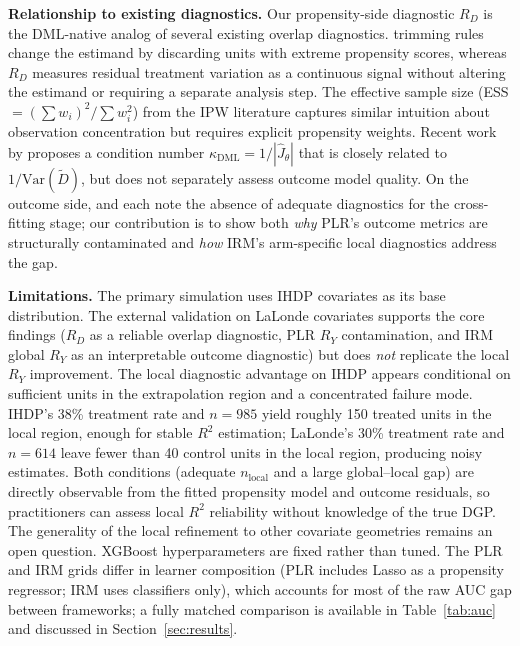\documentclass[12pt]{article}
\begin{document}
\medskip
\noindent\textbf{Relationship to existing diagnostics.} Our propensity-side diagnostic $R_D$ is the DML-native analog of several existing overlap diagnostics. \citet{Crump2009} trimming rules change the estimand by discarding units with extreme propensity scores, whereas $R_D$ measures residual treatment variation as a continuous signal without altering the estimand or requiring a separate analysis step. The effective sample size (ESS $= (\sum w_i)^2 / \sum w_i^2$) from the IPW literature captures similar intuition about observation concentration but requires explicit propensity weights. Recent work by \citet{Chernozhukov2025} proposes a condition number $\kappa_{\text{DML}} = 1/|\hat{J}_\theta|$ that is closely related to $1/\mathrm{Var}(\tilde{D})$, but does not separately assess outcome model quality. On the outcome side, \citet{Knaus2022} and \citet{Babino2020} each note the absence of adequate diagnostics for the cross-fitting stage; our contribution is to show both \emph{why} PLR's outcome metrics are structurally contaminated and \emph{how} IRM's arm-specific local diagnostics address the gap.

\medskip
\noindent\textbf{Limitations.} The primary simulation uses IHDP covariates as its base distribution. The external validation on LaLonde covariates supports the core findings ($R_D$ as a reliable overlap diagnostic, PLR $R_Y$ contamination, and IRM global $R_Y$ as an interpretable outcome diagnostic) but does \emph{not} replicate the local $R_Y$ improvement. The local diagnostic advantage on IHDP appears conditional on sufficient units in the extrapolation region and a concentrated failure mode. IHDP's 38\% treatment rate and $n=985$ yield roughly 150 treated units in the local region, enough for stable $R^2$ estimation; LaLonde's 30\% treatment rate and $n=614$ leave fewer than 40 control units in the local region, producing noisy estimates. Both conditions (adequate $n_{\text{local}}$ and a large global--local gap) are directly observable from the fitted propensity model and outcome residuals, so practitioners can assess local $R^2$ reliability without knowledge of the true DGP. The generality of the local refinement to other covariate geometries remains an open question. XGBoost hyperparameters are fixed rather than tuned. The PLR and IRM grids differ in learner composition (PLR includes Lasso as a propensity regressor; IRM uses classifiers only), which accounts for most of the raw AUC gap between frameworks; a fully matched comparison is available in Table~\ref{tab:auc} and discussed in Section~\ref{sec:results}.
\end{document}
